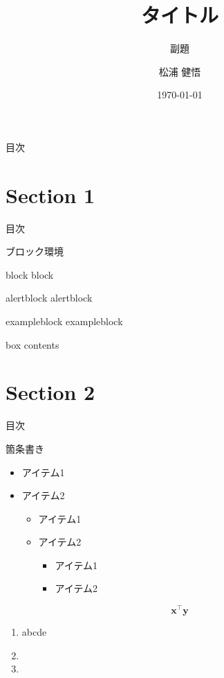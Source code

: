 \documentclass[aspectratio=169, dvipdfmx, 11pt]{beamer} %
\title[Short title]{タイトル}
\subtitle{副題}
\author[著者略称]{松浦 健悟}
\institute[所属略称]{東京大学教養学部統合自然科学科物質基礎科学コース}
\date{\today}
\begin{document}
\maketitle

\begin{frame}{目次}
    \tableofcontents
\end{frame}

\section{Section 1}
\begin{frame}{目次}
    \tableofcontents[currentsection]
\end{frame}

\begin{frame}{ブロック環境}
    \begin{block}{block}
    block
    \end{block}
    \begin{alertblock}{alertblock}
    alertblock
    \end{alertblock}
    \begin{exampleblock}{exampleblock}
    exampleblock
    \end{exampleblock}
    \begin{tcolorbox}[colframe=green,
    colback=green!10!white,
    colbacktitle=green!40!white,
    coltitle=black, fonttitle=\bfseries,
    title=My box]
        box contents
    \end{tcolorbox}
\end{frame}

\section{Section 2}
\begin{frame}{目次}
    \tableofcontents[currentsection]
\end{frame}

\begin{frame}{箇条書き}
    \begin{itemize}
    \item アイテム1
    \item \alert{アイテム2}
        \begin{itemize}
        \item アイテム1
        \item \alert{アイテム2}
            \begin{itemize}
            \item アイテム1
            \item \alert{アイテム2}
            \end{itemize}
        \end{itemize}
    \end{itemize}
    \[
    \bm{x}^\top\bm{y}
    \]
    \begin{enumerate}
    \item abcde
    \item {}
    \item 
    \end{enumerate}
\end{frame}
\end{document}
